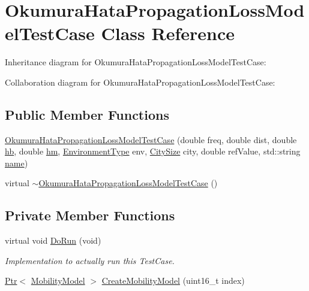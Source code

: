 \hypertarget{classOkumuraHataPropagationLossModelTestCase}{}\section{Okumura\+Hata\+Propagation\+Loss\+Model\+Test\+Case Class Reference}
\label{classOkumuraHataPropagationLossModelTestCase}


Inheritance diagram for Okumura\+Hata\+Propagation\+Loss\+Model\+Test\+Case\+:


Collaboration diagram for Okumura\+Hata\+Propagation\+Loss\+Model\+Test\+Case\+:
\subsection*{Public Member Functions}
\begin{DoxyCompactItemize}
\item 
\hyperlink{classOkumuraHataPropagationLossModelTestCase_a8cac899e5399f124dc5e45ac372db072}{Okumura\+Hata\+Propagation\+Loss\+Model\+Test\+Case} (double freq, double dist, double \hyperlink{lte__pathloss_8m_a193c482b47dea4d7243e253acc8b2bee}{hb}, double \hyperlink{lte__pathloss_8m_adf48bfd0f3afa8972e753a0f895b0a51}{hm}, \hyperlink{group__propagation_ga0e392ed771a28c92112047e63308a53a}{Environment\+Type} env, \hyperlink{group__propagation_ga29c9a1b1a58b6a56054ff5ea4c5a574d}{City\+Size} city, double ref\+Value, std\+::string \hyperlink{generate__test__data__lte__spectrum__model_8m_ab74e6bf80237ddc4109968cedc58c151}{name})
\item 
virtual \hyperlink{classOkumuraHataPropagationLossModelTestCase_ad2a9e7d3645294b42508864dfa70bfde}{$\sim$\+Okumura\+Hata\+Propagation\+Loss\+Model\+Test\+Case} ()
\end{DoxyCompactItemize}
\subsection*{Private Member Functions}
\begin{DoxyCompactItemize}
\item 
virtual void \hyperlink{classOkumuraHataPropagationLossModelTestCase_a2eeb636f42a7780e1767fb2fb21875af}{Do\+Run} (void)
\begin{DoxyCompactList}\small\item\em Implementation to actually run this Test\+Case. \end{DoxyCompactList}\item 
\hyperlink{classns3_1_1Ptr}{Ptr}$<$ \hyperlink{classns3_1_1MobilityModel}{Mobility\+Model} $>$ \hyperlink{classOkumuraHataPropagationLossModelTestCase_a8c5c321bfbd63beebd752f02dbe6b49b}{Create\+Mobility\+Model} (uint16\+\_\+t index)
\end{DoxyCompactItemize}

